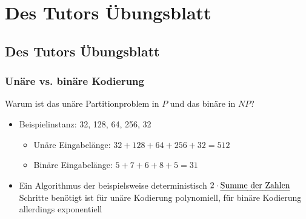 




\section{Des Tutors Übungsblatt}
\subsection{Des Tutors Übungsblatt}
\begin{frame}
	\frametitle{Unäre vs. binäre Kodierung}
	Warum ist das unäre Partitionproblem in $P$ und das binäre in $NP$?
	\begin{itemize}
		\item Beispielinstanz: 32, 128, 64, 256, 32
		\begin{itemize}
			\item Unäre Eingabelänge: $32 + 128 + 64 + 256 + 32 = 512$
			\item Binäre Eingabelänge: $5 + 7 + 6 + 8 + 5 = 31$
		\end{itemize}
		\item Ein Algorithmus der beispielsweise deterministisch $2 \cdot \text{\emph{Summe der Zahlen}}$ Schritte benötigt ist für unäre Kodierung polynomiell, für binäre Kodierung allerdings exponentiell
	\end{itemize}
\end{frame}

